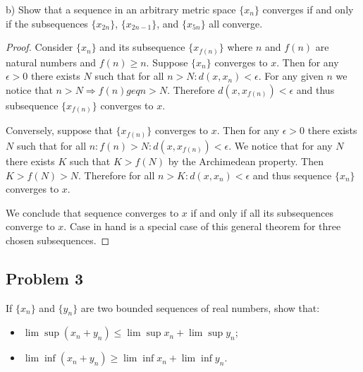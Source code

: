 \documentclass{article}
\begin{document}
\begin{tcolorbox}
b) Show that a sequence in an arbitrary metric space $\{x_n\}$ converges if and only if the subsequences $\{x_{2n}\}$, $\{x_{2n-1}\}$, and $\{x_{5n}\}$ all converge.
\end{tcolorbox}

\begin{proof}
Consider $\{x_{n}\}$ and its subsequence $\{x_{f(n)}\}$ where $n$ and $f(n)$ are natural numbers and $f(n) \geq n$. Suppose $\{x_{n}\}$ converges to $x$. Then for any $\epsilon > 0$ there exists $N$ such that for all $n > N: d(x, x_n) < \epsilon$. For any given $n$ we notice that $n>N \Rightarrow f(n) 
geq n > N$. Therefore $d(x, x_{f(n)}) < \epsilon$ and thus subsequence $\{x_{f(n)}\}$ converges to $x$.

Conversely, suppose that $\{x_{f(n)}\}$ converges to $x$. Then for any $\epsilon > 0$ there exists $N$ such that for all $n: f(n) > N: d(x, x_{f(n)}) < \epsilon$. We notice that for any $N$ there exists $K$ such that $K > f(N)$ by the Archimedean property. Then $K > f(N) > N$. Therefore for all $n > K : d(x, x_n) < \epsilon$ and thus sequence $\{x_n\}$ converges to $x$.

We conclude that sequence converges to $x$ if and only if all its subsequences converge to $x$. Case in hand is a special case of this general theorem for three chosen subsequences.
\end{proof}


\subsection*{Problem 3}

\begin{tcolorbox}
If $\{x_n\}$ and $\{y_n\}$ are two bounded sequences of real numbers, show that:
\begin{itemize}
    \item $\lim \sup (x_n + y_n) \leq \lim \sup x_n + \lim \sup y_n$;
    \item $\lim \inf (x_n + y_n) \geq \lim \inf x_n + \lim \inf y_n$.
\end{itemize}
\end{tcolorbox}
\end{document}
